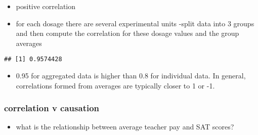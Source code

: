 \documentclass[
]{book}
\newenvironment{Shaded}{\begin{snugshade}}{\end{snugshade}}
\newcommand{\DecValTok}[1]{\textcolor[rgb]{0.00,0.00,0.81}{#1}}
\newcommand{\FloatTok}[1]{\textcolor[rgb]{0.00,0.00,0.81}{#1}}
\newcommand{\FunctionTok}[1]{\textcolor[rgb]{0.00,0.00,0.00}{#1}}
\newcommand{\NormalTok}[1]{#1}
\newcommand{\OtherTok}[1]{\textcolor[rgb]{0.56,0.35,0.01}{#1}}
\newcommand{\SpecialCharTok}[1]{\textcolor[rgb]{0.00,0.00,0.00}{#1}}
\providecommand{\tightlist}{%
  \setlength{\itemsep}{0pt}\setlength{\parskip}{0pt}}
\theoremstyle{definition}
\theoremstyle{definition}
\theoremstyle{definition}
\theoremstyle{definition}
\theoremstyle{remark}
\begin{document}
\begin{itemize}
\tightlist
\item
  positive correlation
\item
  for each dosage there are several experimental units
  -split data into 3 groups and then compute the correlation for these dosage values and the group averages
\end{itemize}

\begin{Shaded}
\end{Shaded}

\begin{verbatim}
## [1] 0.9574428
\end{verbatim}

\begin{itemize}
\tightlist
\item
  0.95 for aggregated data is higher than 0.8 for individual data. In general, correlations formed from averages are typically closer to 1 or -1.
\end{itemize}

\hypertarget{correlation-v-causation}{%
\subsubsection{correlation v causation}\label{correlation-v-causation}}

\begin{itemize}
\tightlist
\item
  what is the relationship between average teacher pay and SAT scores?
\end{itemize}

\begin{Shaded}
\end{Shaded}
\end{document}
